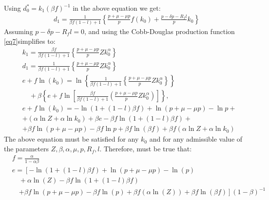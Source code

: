 \documentclass[12pt]{report}
\begin{document}
Using \(d_0^*=k_1(\beta f)^{-1}\) in the above equation we get:
\begin{align}
    d_1 =\frac{1}{\beta f (1-l)+1}\left\{ \frac{p + \mu - \mu p}{p}f(k_{0}) + \frac{p - \delta p - R_f l}{p} k_{0}\right\}
\end{align}
Assuming \(p - \delta p - R_f l = 0\), and using the Cobb-Douglas production function \ref{eq7}simplifies to:
\begin{align*}
    &k_1 = \frac{\beta f}{\beta f (1-l)+1}\left\{ \frac{p + \mu - \mu p}{p}Z k_0^{\alpha}\right\}\\
    &d_1 =\frac{1}{\beta f (1-l)+1}\left\{  \frac{p + \mu - \mu p}{p}Z k_0^{\alpha}\right\}\\
    &e + f \ln(k_0) = \ln \left\{ \frac{1}{\beta f (1-l)+1}\left\{ \frac{p + \mu - \mu p}{p}Z k_0^{\alpha}\right\}\right\} \nonumber \\
    &\quad + \beta \left\{ e + f \ln \left[ \frac{\beta f}{\beta f (1-l)+1}\left(  \frac{p + \mu - \mu p}{p}Z k_0^{\alpha}\right)\right]  \right\},\\
    &e + f \ln(k_0) = -\ln{(1+(1-l)\beta f)} + \ln{(p + \mu - \mu p)} - \ln{p} +\\
    &+({\alpha}\ln{Z} + {\alpha}\ln{k_0}) + \beta e - \beta f \ln{(1+(1-l)\beta f)} +\\
    &+\beta f \ln{(p + \mu - \mu p)} - \beta f \ln{p} +\beta f \ln{(\beta f)}+ \beta f ({\alpha}\ln{Z} + {\alpha}\ln{k_0})
\end{align*}
The above equation must be satisfied for any \(k_0\) and for any admissible value of the parameters \(Z, \beta, \alpha,
\mu, p, R_f,l\). Therefore, must be true that:
\begin{align}
    &f = \frac{\alpha}{1-\alpha \beta} \label{eq30}\\
    &e = \left[ -\ln(1+(1-l)\beta f) + \ln(p + \mu - \mu p) - \ln(p) \right.\nonumber\\
    &\quad + \alpha\ln(Z) - \beta f \ln(1+(1-l)\beta f) \nonumber\\
    &\quad \left. + \beta f \ln(p + \mu - \mu p) - \beta f \ln(p) + \beta f (\alpha\ln(Z)) +\beta f \ln{(\beta f)} \right](1-\beta)^{-1}\nonumber
\end{align}
\end{document}

